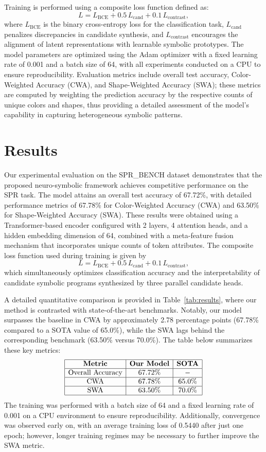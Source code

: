 \documentclass[11pt]{article}
\begin{document}
\noindent Training is performed using a composite loss function defined as:
\[
L = L_{\text{BCE}} + 0.5\, L_{\text{cand}} + 0.1\, L_{\text{contrast}},
\]
where \(L_{\text{BCE}}\) is the binary cross-entropy loss for the classification task, \(L_{\text{cand}}\) penalizes discrepancies in candidate synthesis, and \(L_{\text{contrast}}\) encourages the alignment of latent representations with learnable symbolic prototypes. The model parameters are optimized using the Adam optimizer with a fixed learning rate of 0.001 and a batch size of 64, with all experiments conducted on a CPU to ensure reproducibility. Evaluation metrics include overall test accuracy, Color-Weighted Accuracy (CWA), and Shape-Weighted Accuracy (SWA); these metrics are computed by weighting the prediction accuracy by the respective counts of unique colors and shapes, thus providing a detailed assessment of the model's capability in capturing heterogeneous symbolic patterns.

\section{Results}
Our experimental evaluation on the SPR\_BENCH dataset demonstrates that the proposed neuro-symbolic framework achieves competitive performance on the SPR task. The model attains an overall test accuracy of 67.72\%, with detailed performance metrics of 67.78\% for Color-Weighted Accuracy (CWA) and 63.50\% for Shape-Weighted Accuracy (SWA). These results were obtained using a Transformer-based encoder configured with 2 layers, 4 attention heads, and a hidden embedding dimension of 64, combined with a meta-feature fusion mechanism that incorporates unique counts of token attributes. The composite loss function used during training is given by
\[
L = L_{\text{BCE}} + 0.5\, L_{\text{cand}} + 0.1\, L_{\text{contrast}},
\]
which simultaneously optimizes classification accuracy and the interpretability of candidate symbolic programs synthesized by three parallel candidate heads.

A detailed quantitative comparison is provided in Table~\ref{tab:results}, where our method is contrasted with state-of-the-art benchmarks. Notably, our model surpasses the baseline in CWA by approximately 2.78 percentage points (67.78\% compared to a SOTA value of 65.0\%), while the SWA lags behind the corresponding benchmark (63.50\% versus 70.0\%). The table below summarizes these key metrics:
\[
\begin{array}{|c|c|c|}
\hline
\textbf{Metric} & \textbf{Our Model} & \textbf{SOTA} \\
\hline
\text{Overall Accuracy} & 67.72\% & - \\
\hline
\text{CWA} & 67.78\% & 65.0\% \\
\hline
\text{SWA} & 63.50\% & 70.0\% \\
\hline
\end{array}
\]
The training was performed with a batch size of 64 and a fixed learning rate of 0.001 on a CPU environment to ensure reproducibility. Additionally, convergence was observed early on, with an average training loss of 0.5440 after just one epoch; however, longer training regimes may be necessary to further improve the SWA metric.
\end{document}
